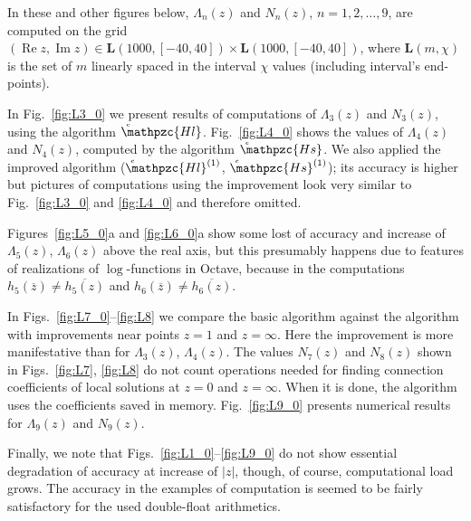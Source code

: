 \documentclass[11pt]{article}
\newcommand{\MF}[1]{\mathop{#1}\nolimits}
\renewcommand{\vec}[1]{\bm{#1}}
\renewcommand{\Re}{\MF{\mathrm{Re}}} \renewcommand{\Im}{\MF{\mathrm{Im}}}
\def\psHeunClfin{\setbox0=\hbox{\tiny\itshape\bfseries \kern1.52mm c}\wd0=0pt\ht0=0pt\dp0=0pt\MF{\hbox{\raise1.67ex\copy0}\mathpzc{Hl}}}%
\def\psHeunCsfin{\setbox0=\hbox{\tiny\itshape\bfseries \kern1.52mm c}\wd0=0pt\ht0=0pt\dp0=0pt\MF{\hbox{\raise1.67ex\copy0}\mathpzc{Hs}}}%
\def\psHeunClnearone{\setbox0=\hbox{\tiny\itshape\bfseries \kern1.52mm c}\wd0=0pt\ht0=0pt\dp0=0pt\MF{\hbox{\raise1.67ex\copy0}\mathpzc{Hl}^{(1)}}}%
\def\psHeunCsnearone{\setbox0=\hbox{\tiny\itshape\bfseries \kern1.52mm c}\wd0=0pt\ht0=0pt\dp0=0pt\MF{\hbox{\raise1.67ex\copy0}\mathpzc{Hs}^{(1)}}}%
\begin{document}
In these and other figures below, $\Lambda_n(z)$ and $N_n(z)$, $n=1,2,\ldots,9$, are computed on the grid $(\Re z,\Im z)\in\vec{L}(1000,[-40,40])\times\vec{L}(1000,[-40,40])$, where $\vec{L}(m,\chi)$ is the set of $m$ linearly spaced in the interval $\chi$ values (including interval's end-points). 

In Fig.~\ref{fig:L3_0} we present results of computations
of $\Lambda_3(z)$ and $N_3(z)$, using the algorithm $\psHeunClfin$. Fig.~\ref{fig:L4_0} shows the values 
of $\Lambda_4(z)$ and $N_4(z)$, computed by the algorithm $\psHeunCsfin$. We also applied the improved algorithm ($\psHeunClnearone$, $\psHeunCsnearone$); its accuracy is higher but pictures of computations using the improvement look very similar to Fig.~\ref{fig:L3_0} and \ref{fig:L4_0} and therefore omitted. 

Figures~\ref{fig:L5_0}a and \ref{fig:L6_0}a show some lost of accuracy and increase of $\Lambda_5(z)$, $\Lambda_6(z)$ above the real axis, but this presumably happens due to features of realizations of $\log$-functions in Octave, because in the computations $h_5(\overline{z})\neq\overline{h_5(z)}$ and $h_6(\overline{z})\neq\overline{h_6(z)}$.


In Figs.~\ref{fig:L7_0}--\ref{fig:L8} we compare the basic algorithm against the algorithm with improvements near points $z=1$ and $z=\infty$. Here  the improvement is more manifestative than for $\Lambda_3(z)$, $\Lambda_4(z)$. The values $N_7(z)$ and $N_8(z)$ shown in Figs.~\ref{fig:L7}, \ref{fig:L8} do not count operations needed for finding connection coefficients of local solutions at $z=0$ and $z=\infty$. When it is done, the algorithm uses  the coefficients saved in memory. Fig.~\ref{fig:L9_0} presents numerical results for $\Lambda_9(z)$ and $N_9(z)$. 

Finally, we note that Figs.~\ref{fig:L1_0}--\ref{fig:L9_0} do not show essential degradation of accuracy at increase of $|z|$, though, of course, computational load grows. The accuracy in the examples of computation is seemed to be fairly satisfactory for the used double-float arithmetics.
\end{document}
